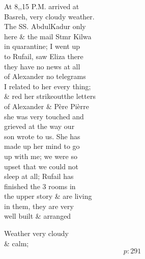 \documentclass{report}
\begin{document}
	\par{
 	At 8,,15 P.M. arrived at\ \\Basreh, very cloudy weather.\ \\The SS. AbdulKadur only\ \\here \& the mail Stmr Kilwa\ \\in quarantine; I went up\ \\to Rufail, saw Eliza there\ \\they have no news at all\ \\of Alexander no telegrams\ \\I related to her every thing;\ \\\& red her \lbrack strikeout\rbrack the letters\ \\of Alexander \& Père Pièrre\ \\she was very touched and\ \\grieved at the way our\ \\son wrote to us. She has\ \\made up her mind to go\ \\up with me; we were so\ \\upset that we could not\ \\sleep at all; Rufail has\ \\finished the 3 rooms in\ \\the upper story \& are living\ \\in them, they are very\ \\well built \& arranged\ \\
	}

	\par{
 	Weather very cloudy\ \\\& calm;\ \\
  \[p: 291 \]

	}



\end{document}
